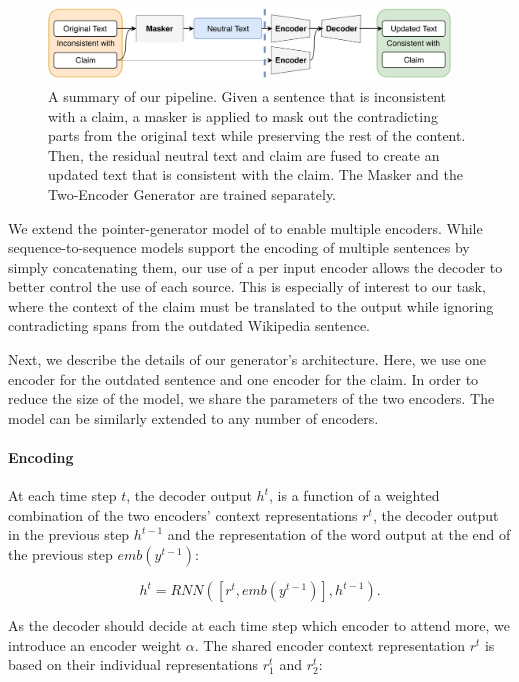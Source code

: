 \documentclass[letterpaper]{article}
\begin{document}
\begin{figure}[!t]
\centering
\includegraphics[width=0.95\textwidth]{inference_pipeline_wtrain.pdf}
\caption{A summary of our pipeline. Given a sentence that is inconsistent with a claim, a masker is applied to mask out the contradicting parts from the original text while preserving the rest of the content. Then, the residual neutral text and claim are fused to create an updated text that is consistent with the claim. The Masker and the Two-Encoder Generator are trained separately.
 \label{fig:pipeline}}
\end{figure}

We extend the pointer-generator model of \cite{pointer-generator} to enable multiple encoders. While sequence-to-sequence models support the encoding of multiple sentences by simply concatenating them, our use of a per input encoder allows the decoder to better control the use of each source. This is especially of interest to our task, where the context of the claim must be translated to the output while ignoring contradicting spans from the outdated Wikipedia sentence.

Next, we describe the details of our generator's architecture. Here, we use one encoder for the outdated sentence and one encoder for the claim. In order to reduce the size of the model, we share the parameters of the two encoders. The model can be similarly extended to any number of encoders.



\paragraph{Encoding}
At each time step $t$, the decoder output $h^t$, is a function of a weighted combination of the two encoders' context representations $r^{t}$, the decoder output in the previous step $h^{t-1}$ and the representation of the word output at the end of the previous step $emb(y^{t-1})$:

\begin{equation}
    h^t = \textit{RNN}([r^t, emb(y^{t-1})], h^{t-1}).
    \label{eq:decoder}
\end{equation}

As the decoder should decide at each time step which encoder to attend more, we introduce an encoder weight $\alpha$. The shared encoder context representation $r^t$ is based on their individual representations $r^t_1$ and $r^t_2$:
\end{document}
